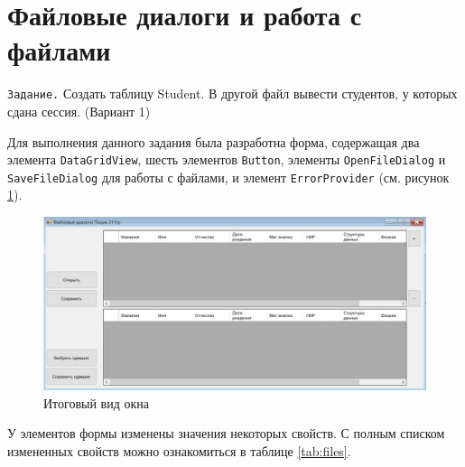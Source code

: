 \section{Файловые диалоги и работа с файлами}
\verb|Задание.| Создать таблицу Student. В другой файл вывести студентов, у которых сдана сессия. (Вариант 1)

Для выполнения данного задания была разработна форма, содержащая два элемента 
\verb|DataGridView|, шесть элементов \verb|Button|, элементы \verb|OpenFileDialog| и \verb|SaveFileDialog| для 
работы с файлами, и элемент \verb|ErrorProvider| (см. рисунок \ref{fig:files_const}).

\begin{figure}[H]
\centering
\includegraphics[scale=.45]{../img/files/files_konstructor.jpg}
\caption{Итоговый вид окна}
\label{fig:files_const}
\end{figure}

У элементов формы изменены значения некоторых свойств. С полным списком 
измененных свойств можно ознакомиться в таблице \ref{tab:files}.

